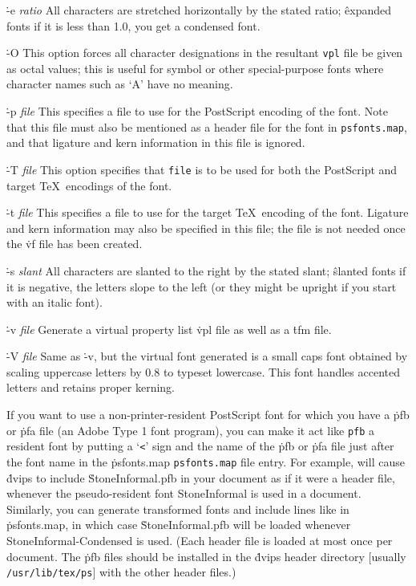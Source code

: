 {\options
\.{-e {\it ratio}}
All characters are stretched horizontally by the stated ratio;
\^{expanded fonts}
if it is less than 1.0, you get a condensed font.

\.{-O}
This option forces all character designations in the resultant
{\tt vpl} file be given as octal values; this is useful for
symbol or other special-purpose fonts where character names such
as `A' have no meaning.

\.{-p {\it file}}
This specifies a file to use for the PostScript encoding of the
font.  Note that this file must also be mentioned as a header
file for the font in {\tt psfonts.map}, and that ligature
and kern information in this file is ignored.

\.{-T {\it file}}
This option specifies that {\tt file} is to be used for both
the PostScript and target \TeX\ encodings of the font.

\.{-t {\it file}}
This specifies a file to use for the target \TeX\ encoding of the
font.  Ligature and kern information may also be specified in this
file; the file is not needed once the \.{vf} file has been created.

\.{-s {\it slant}}
All characters are slanted to the right by the stated slant;
\^{slanted fonts}
if it is negative, the letters slope to the left (or they might be
upright if you start with an italic font).

\.{-v {\it file}}
Generate a virtual property list \.{vpl} file as well as a \.{tfm} file.

\.{-V {\it file}}
Same as \.{-v}, but the virtual font generated is a small caps font obtained
by scaling uppercase letters by 0.8 to typeset lowercase. This font
handles accented letters and retains proper kerning.\par}


If you want to use a non-printer-resident PostScript font for which you have
a \.{pfb} or \.{pfa} file (an Adobe Type 1 font program),
you can make it act like
\^{{\tt pfb}}
a resident font by putting a `{\tt <}' sign
and the name of the \.{pfb} or \.{pfa} file just after the font name in the
\.{psfonts.map}
\^{{\tt psfonts.map}}
file entry. For example,
\noindent
will cause \.{dvips} to include \.{StoneInformal.pfb} in your document as if
it were a header file, whenever the pseudo-resident font StoneInformal is
used in a document.   Similarly, you can generate transformed fonts and
include lines like
\noindent
in \.{psfonts.map}, in which case \.{StoneInformal.pfb} will be loaded whenever
StoneInformal-Condensed is used. (Each header file is loaded at most once per
document. The \.{pfb} files should be installed in the \.{dvips} header
directory [usually {\tt /usr/lib/tex/ps}] with the other header files.)

